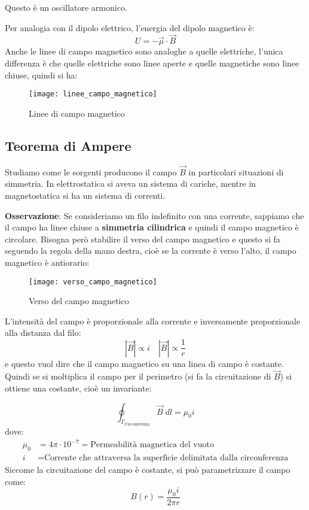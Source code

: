 \documentclass[a4paper]{article}
\begin{document}
\begin{example}
  Questo è un oscillatore armonico.

  \vspace{1em}
  \noindent
  Per analogia con il dipolo elettrico, l'energia del dipolo magnetico è:
  \[
    U = - \vec{\mu} \cdot \vec{B}
  \] 
  Anche le linee di campo magnetico sono analoghe a quelle elettriche, l'unica differenza
  è che quelle elettriche sono linee aperte e quelle magnetiche sono linee chiuse, quindi si ha:
  \begin{figure}[H]
    \centering
    \texttt{[image: linee\_campo\_magnetico]}
    \caption{Linee di campo magnetico}
  \end{figure}
\end{example}

\subsection{Teorema di Ampere}
Studiamo come le sorgenti producono il campo \( \vec{B} \) in particolari situazioni
di simmetria. In elettrostatica si aveva un sistema di cariche, mentre in magnetostatica
si ha un sistema di correnti.

\vspace{1em}
\noindent
\textbf{Osservazione}: Se consideriamo un filo indefinito con una corrente, sappiamo che
il campo ha linee chiuse a \textbf{simmetria cilindrica} e quindi il campo magnetico
è circolare. Bisogna però stabilire il verso del campo magnetico e questo si fa seguendo
la regola della mano destra, cioè se la corrente è verso l'alto, il campo magnetico
è antiorario:
\begin{figure}[H]
  \centering
  \texttt{[image: verso\_campo\_magnetico]}
  \caption{Verso del campo magnetico}
\end{figure}
\noindent
L'intensità del campo è proporzionale alla corrente e inversamente proporzionale alla
distanza dal filo:
\[
  |\vec{B}| \propto i \quad |\vec{B}| \propto \frac{1}{r}
\] 
e questo vuol dire che il campo magnetico su una linea di campo è costante. Quindi se
si moltiplica il campo per il perimetro (si fa la circuitazione di \( \vec{B} \)) si
ottiene una costante, cioè un invariante:
\begin{definition}
  \[
    \oint_{\Gamma_{\text{Circonferenza}}} \vec{B} \; dl = \mu_0 i
  \] 
  dove:
  \[
    \begin{aligned}
      \mu_0 & = 4 \pi \cdot 10^{-7} = \text{Permeabilità magnetica del vuoto} \\
      i & = \text{Corrente che attraversa la superficie delimitata dalla circonferenza}
    \end{aligned}
  \] 
  Siccome la circuitazione del campo è costante, si può parametrizzare il campo come:
  \[
    B(r) = \frac{\mu_0 i}{2 \pi r}
  \] 
\end{definition}
\end{document}
